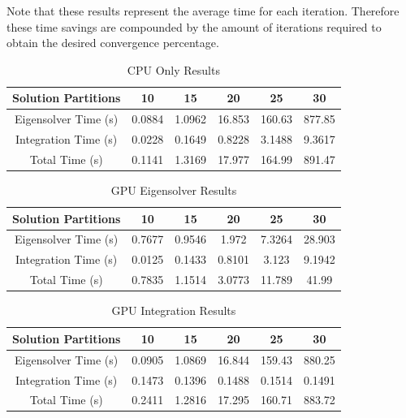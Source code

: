 \documentclass[conference, twoside]{IEEEtran}
\begin{document}
Note that these results represent the average time for each iteration. Therefore these time savings are compounded by the amount of iterations required to obtain the desired convergence percentage.

\begin{table}
    \renewcommand{\arraystretch}{1.3} %
    \caption{CPU Only Results}
    \label{cpu-only-results}
    \centering
    \begin{tabular}{c||c|c|c|c|c}
        \hline
        {Solution Partitions} & {10} & {15} & {20} & {25} & {30} \\
        \hline
        \hline
        {Eigensolver Time (s)}              & {0.0884} & {1.0962} & {16.853} & {160.63} & {877.85}\\
        {Integration Time (s)}              & {0.0228} & {0.1649} & {0.8228} & {3.1488} & {9.3617}\\
        {Total Time (s)}                    & {0.1141} & {1.3169} & {17.977} & {164.99} & {891.47}\\
        \hline
    \end{tabular}
\end{table}

\begin{table}
    \renewcommand{\arraystretch}{1.3} %
    \caption{GPU Eigensolver Results}
    \label{gpu-eigensolver-results}
    \centering
    \begin{tabular}{c||c|c|c|c|c}
        \hline
        {Solution Partitions} & {10} & {15} & {20} & {25} & {30} \\
        \hline
        \hline
        {Eigensolver Time (s)}              & {0.7677} & {0.9546} & {1.972}  & {7.3264} & {28.903}\\
        {Integration Time (s)}              & {0.0125} & {0.1433} & {0.8101} & {3.123}  & {9.1942}\\
        {Total Time (s)}                    & {0.7835} & {1.1514} & {3.0773} & {11.789} & {41.99} \\
        \hline
    \end{tabular}
\end{table}

\begin{table}
    \renewcommand{\arraystretch}{1.3} %
    \caption{GPU Integration Results}
    \label{gpu-integration-results}
    \centering
    \begin{tabular}{c||c|c|c|c|c}
        \hline
        {Solution Partitions} & {10} & {15} & {20} & {25} & {30} \\
        \hline
        \hline
        {Eigensolver Time (s)}              & {0.0905} & {1.0869} & {16.844} & {159.43} & {880.25}\\
        {Integration Time (s)}              & {0.1473} & {0.1396} & {0.1488} & {0.1514} & {0.1491}\\
        {Total Time (s)}                    & {0.2411} & {1.2816} & {17.295} & {160.71} & {883.72}\\
        \hline
    \end{tabular}
\end{table}
\end{document}
